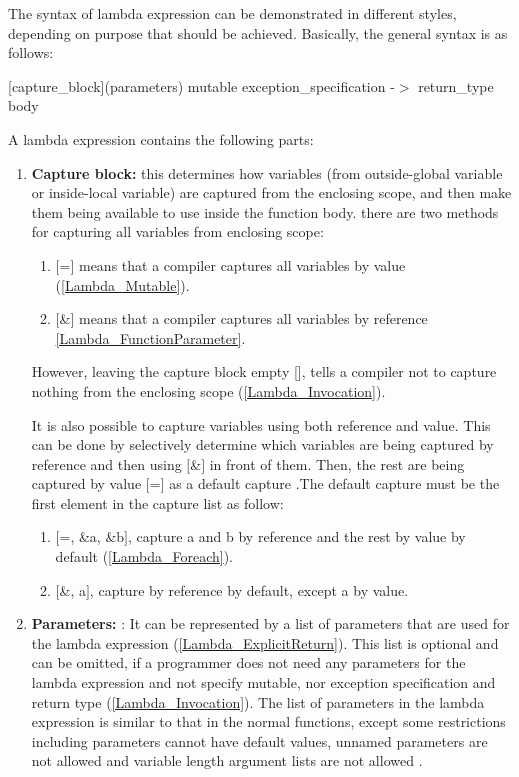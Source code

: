 \documentclass[11pt]{report}
\begin{document}
The syntax of lambda expression can be demonstrated in different styles, depending on purpose that should be achieved. Basically, the general syntax is as follows:
\begin{center}
[capture\_block](parameters) mutable exception\_specification -$>$ return\_type {body}
\end{center}

A lambda expression contains the following parts:
\begin{enumerate}
\item \textbf{Capture block:} this determines how variables (from outside-global variable or inside-local variable) are captured from the enclosing scope, and then make them being available to use inside the function body. there are two methods for capturing all variables from enclosing scope:

      \begin{enumerate}
      \item $[$=$]$ means that a compiler captures all variables by value (\ref{Lambda_Mutable}).
      \item $[$\&$]$ means that a compiler captures all variables by reference 
             \ref{Lambda_FunctionParameter}.
      \end{enumerate}
      However, leaving the capture block empty [], tells a compiler not to capture nothing from the enclosing scope (\ref{Lambda_Invocation}).
      
      It is also possible to capture variables using both reference and value. This can be done by selectively determine which variables are being captured by reference and then using $[$\&$]$ in front of them. Then, the rest are being captured by value $[$=$]$ as a default capture \cite{Gregorie:professionalcpp}.The default capture must be the first element in the capture list as follow:
      \begin{enumerate}
      \item $[$=, \&a, \&b$]$, capture a and b by reference and the rest by value by default (\ref{Lambda_Foreach}).
      \item $[$\&, a$]$, capture by reference by default, except a by value.
      \end{enumerate}
      
      
\item \textbf{Parameters:} : It can be represented by a list of parameters that are used for the lambda expression (\ref{Lambda_ExplicitReturn}). This list is optional and can be omitted, if a programmer does not need any parameters for the lambda expression and not specify mutable, nor exception specification and return type (\ref{Lambda_Invocation}). The list of parameters in the lambda expression is similar to that in the normal functions, except some restrictions including parameters cannot have default values, unnamed parameters are not allowed and variable length argument lists are not allowed \cite{Cppreference:2012:Cpp11}.


\end{enumerate}
\end{document}
